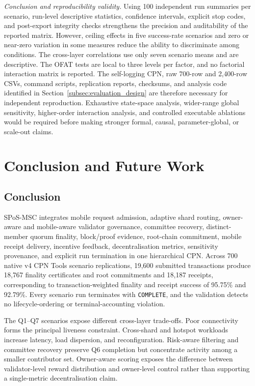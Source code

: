 \documentclass[a4paper,fleqn]{cas-sc}
\begin{document}
\textit{Conclusion and reproducibility validity.}
Using 100 independent run summaries per scenario, run-level descriptive
statistics, confidence intervals, explicit stop codes, and post-export
integrity checks strengthens the precision and auditability of the reported
matrix. However, ceiling effects in five success-rate scenarios and zero or
near-zero variation in some measures reduce the ability to discriminate among
conditions. The cross-layer correlations use only seven scenario means and are
descriptive. The OFAT tests are local to three levels per factor, and no
factorial interaction matrix is reported. The self-logging CPN, raw 700-row and 2,400-row CSVs, command scripts, replication
reports, checksums, and analysis code identified in Section~\ref{subsec:evaluation_design}
are therefore necessary for independent reproduction. Exhaustive state-space
analysis, wider-range global sensitivity, higher-order interaction analysis,
and controlled executable ablations would be required before making stronger
formal, causal, parameter-global, or scale-out claims.


\section{Conclusion and Future Work}
\label{sec:conclusion}

\subsection{Conclusion}
\label{subsec:conclusion_text}

SPoS-MSC integrates mobile request admission, adaptive shard routing,
owner-aware and mobile-aware validator governance, committee recovery,
distinct-member quorum finality, block/proof evidence, root-chain commitment,
mobile receipt delivery, incentive feedback, decentralisation metrics,
sensitivity provenance, and explicit run termination in one hierarchical CPN.
Across 700 native v4 CPN Tools scenario replications, 19,600 submitted
transactions produce 18,767 finality certificates and root commitments and
18,187 receipts, corresponding to transaction-weighted finality and receipt
success of 95.75\% and 92.79\%. Every scenario run terminates with
\texttt{COMPLETE}, and the validation detects no lifecycle-ordering or
terminal-accounting violation.

The Q1--Q7 scenarios expose different cross-layer trade-offs. Poor connectivity
forms the principal liveness constraint. Cross-shard and hotspot workloads
increase latency, load dispersion, and reconfiguration. Risk-aware filtering
and committee recovery preserve Q6 completion but concentrate activity among a
smaller contributor set. Owner-aware scoring exposes the difference between
validator-level reward distribution and owner-level control rather than
supporting a single-metric decentralisation claim.
\end{document}

